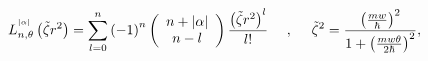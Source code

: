 \begin{equation}
L_{n,\theta}^{^{\left|  \alpha\right|  }}\left(  \tilde{\zeta}r^{2}\right)
=\overset{n}{\underset{l=0}{\sum}}\left(  -1\right)  ^{n}\left(
\begin{array}
[c]{c}%
n+\left|  \alpha\right| \\
n-l
\end{array}
\right)  \frac{\left(  \tilde{\zeta}r^{2}\right)  ^{l}}{l!}\text{
\ \ \ },\text{ \ \ \ }\tilde{\zeta}^{2}=\frac{\left(  \frac{mw}{\hbar}\right)
^{2}}{1+\left(  \frac{mw\theta}{2\hbar}\right)  ^{2}},\label{36.7}%
\end{equation}

